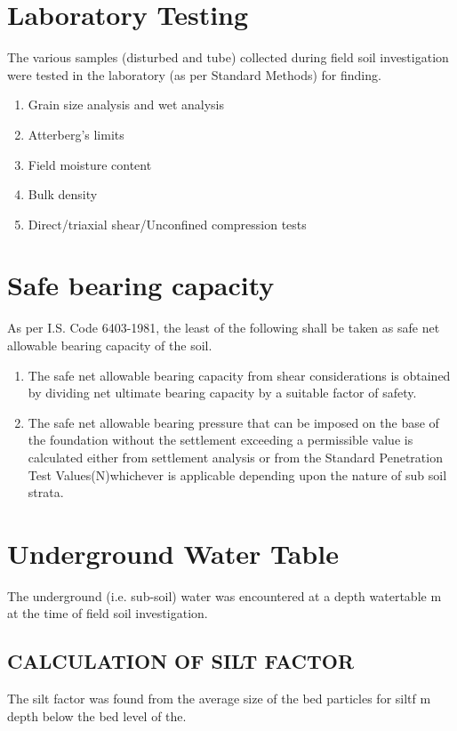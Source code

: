 \documentclass{sett}
\begin{document}
\section{Laboratory Testing}
The various samples (disturbed and tube) collected during field soil investigation were tested in the
laboratory (as per Standard Methods) for finding.
\begin{enumerate}
\item {Grain size analysis and wet analysis}
\item {Atterberg's limits}
\item{Field moisture content}
\item{Bulk density}
\item{Direct/triaxial shear/Unconfined compression tests}
\end{enumerate}
\section{Safe bearing capacity}
As per I.S. Code 6403-1981, the least of the following shall be taken as safe net allowable bearing
capacity of the soil.
\begin{enumerate}
\item{The safe net allowable bearing capacity from shear considerations is obtained by dividing net
ultimate bearing capacity by a suitable factor of safety.}
\item{The safe net allowable bearing pressure that can be imposed on the base of the foundation
without the settlement exceeding a permissible value is calculated either from settlement
analysis or from the Standard Penetration Test Values(N)whichever is applicable depending
upon the nature of sub soil strata.}
\end{enumerate}
\section{Underground Water Table}
The underground (i.e. sub-soil) water was encountered at a depth {{watertable}} m at the time of field soil
investigation.
\clearpage
\subsection{CALCULATION OF SILT FACTOR}

The silt factor was found from the average size of the bed particles for {{siltf}} m depth below the bed level of the.\\

\vspace{0.5cm}
\end{document}
